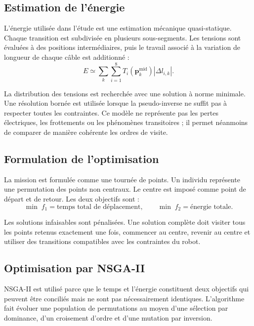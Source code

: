 \subsection{Estimation de l'énergie}

L'énergie utilisée dans l'étude est une estimation mécanique quasi-statique. Chaque transition est subdivisée en plusieurs sous-segments. Les tensions sont évaluées à des positions intermédiaires, puis le travail associé à la variation de longueur de chaque câble est additionné :
\begin{equation}
E\simeq\sum_k\sum_{i=1}^{8}T_i\left(\mathbf{p}^{\mathrm{mid}}_k\right)\left|\Delta l_{i,k}\right|.
\label{eq:energie_tandem}
\end{equation}

La distribution des tensions est recherchée avec une solution à norme minimale. Une résolution bornée est utilisée lorsque la pseudo-inverse ne suffit pas à respecter toutes les contraintes. Ce modèle ne représente pas les pertes électriques, les frottements ou les phénomènes transitoires ; il permet néanmoins de comparer de manière cohérente les ordres de visite.

\subsection{Formulation de l'optimisation}

La mission est formulée comme une tournée de points. Un individu représente une permutation des points non centraux. Le centre est imposé comme point de départ et de retour. Les deux objectifs sont :
\begin{equation}
\min\; f_1=\text{temps total de déplacement},
\qquad
\min\; f_2=\text{énergie totale}.
\label{eq:objectifs_tandem}
\end{equation}

Les solutions infaisables sont pénalisées. Une solution complète doit visiter tous les points retenus exactement une fois, commencer au centre, revenir au centre et utiliser des transitions compatibles avec les contraintes du robot.

\subsection{Optimisation par NSGA-II}

NSGA-II est utilisé parce que le temps et l'énergie constituent deux objectifs qui peuvent être conciliés mais ne sont pas nécessairement identiques. L'algorithme fait évoluer une population de permutations au moyen d'une sélection par dominance, d'un croisement d'ordre et d'une mutation par inversion.

